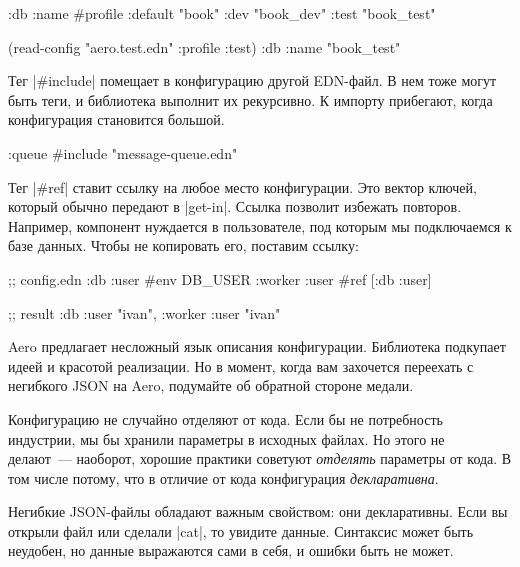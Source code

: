 \begin{english}
  \begin{clojure}
{:db {:name #profile {:default "book"
                      :dev     "book_dev"
                      :test    "book_test"}}}

(read-config "aero.test.edn" {:profile :test})
{:db {:name "book_test"}}
  \end{clojure}
\end{english}

Тег \spverb|#include| помещает в конфигурацию другой EDN-файл. В нем тоже могут
быть теги, и библиотека выполнит их рекурсивно. К импорту прибегают, когда
конфигурация становится большой.

\begin{english}
  \begin{clojure}
{:queue #include "message-queue.edn"}
  \end{clojure}
\end{english}

Тег \spverb|#ref| ставит ссылку на любое место конфигурации. Это вектор ключей,
который обычно передают в \spverb|get-in|. Ссылка позволит избежать повторов.
Например, компонент нуждается в пользователе, под которым мы подключаемся к базе
данных. Чтобы не копировать его, поставим ссылку:

\begin{english}
  \begin{clojure}
;; config.edn
{:db {:user #env DB_USER}
 :worker {:user #ref [:db :user]}}

;; result
{:db {:user "ivan"}, :worker {:user "ivan"}}
  \end{clojure}
\end{english}

Aero предлагает несложный язык описания конфигурации. Библиотека подкупает идеей
и красотой реализации. Но в момент, когда вам захочется переехать с негибкого
JSON на Aero, подумайте об обратной стороне медали.

Конфигурацию не случайно отделяют от кода. Если бы не потребность индустрии, мы
бы хранили параметры в исходных файлах. Но этого не делают~--- наоборот, хорошие
практики советуют \emph{отделять} параметры от кода. В том числе потому, что в
отличие от кода конфигурация \emph{декларативна}.

Негибкие JSON-файлы обладают важным свойством: они декларативны. Если вы открыли
файл или сделали \spverb|cat|, то увидите данные. Синтаксис может быть неудобен,
но данные выражаются сами в себя, и ошибки быть не может.

